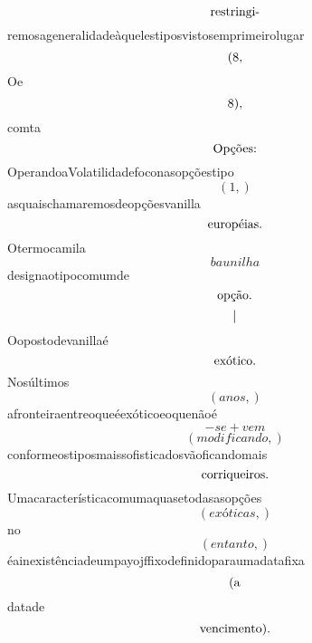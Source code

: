 \documentclass{article}
\begin{document}
\begin{equation}
$restringi-$
\end{equation}remosageneralidadeàquelestiposvistosemprimeirolugar\begin{equation}
$(8,$
\end{equation}Oe\begin{equation}
$8),$
\end{equation}comta\begin{equation}
$Opções:$
\end{equation}OperandoaVolatilidadefoconasopçõestipo\begin{equation}
\left( 1,\right)
\end{equation}asquaischamaremosdeopçõesvanilla\begin{equation}
$européias.$
\end{equation}Otermocamila\begin{equation}
baunilha
\end{equation}designaotipocomumde\begin{equation}
$opção.$
\end{equation}\begin{equation}
$|$
\end{equation}Oopostodevanillaé\begin{equation}
$exótico.$
\end{equation}Nosúltimos\begin{equation}
\left( anos,\right)
\end{equation}afronteiraentreoqueéexóticoeoquenãoé\begin{equation}
- se + vem
\end{equation}\begin{equation}
\left( modificando,\right)
\end{equation}conformeostiposmaissofisticadosvãoficandomais\begin{equation}
$corriqueiros.$
\end{equation}Umacaracterísticacomumaquasetodasasopções\begin{equation}
\left( exóticas,\right)
\end{equation}no\begin{equation}
\left( entanto,\right)
\end{equation}éainexistênciadeumpayojffixodefinidoparaumadatafixa\begin{equation}
$(a$
\end{equation}datade\begin{equation}
$vencimento).$
\end{equation}\begin{equation}

\end{equation}
\end{document}
